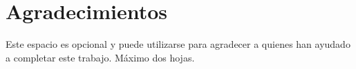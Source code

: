 \chapter*{Agradecimientos}
Este espacio es opcional y puede utilizarse para agradecer a quienes han ayudado a completar este trabajo. Máximo dos hojas.